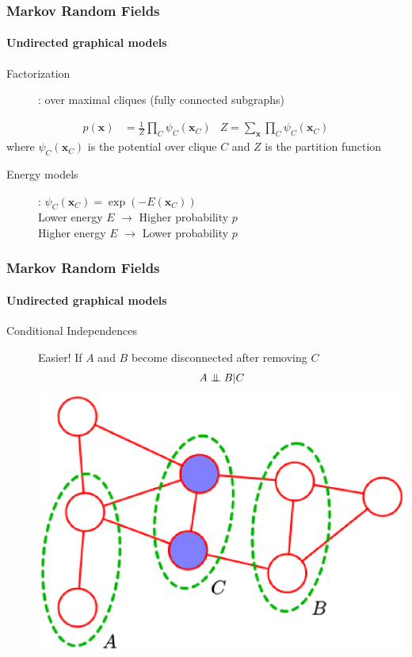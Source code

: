 \documentclass[slidestop,compress,mathserif]{beamer}
\newcommand{\indep}{\ensuremath{\perp\mkern -10mu \perp}}
\begin{document}
\begin{frame}
	\frametitle{Markov Random Fields}
	\framesubtitle{Undirected graphical models}
    \begin{description}
    \item[Factorization]: over maximal cliques (fully connected subgraphs)
    \end{description}
    \begin{align*}
    p(\mathbf{x})&=\frac{1}{Z}\prod_C \psi_C(\mathbf{x}_C)
    &
    Z = \sum_\mathbf{x}\prod_C \psi_C(\mathbf{x}_C)
    \end{align*}
    where $\psi_C(\mathbf{x}_C)$ is the potential over clique $C$ and
    $Z$ is the partition function
     \begin{description}
    \item[Energy models]: $\psi_C(\mathbf{x}_C) = \exp(-E(\mathbf{x}_C))$\\
    Lower energy $E$ $\rightarrow$ Higher probability $p$\\
    Higher energy $E$ $\rightarrow$ Lower probability $p$
  \end{description}
  
\end{frame} 


\begin{frame}
	\frametitle{Markov Random Fields}
	\framesubtitle{Undirected graphical models}
    \begin{description}
    \item[Conditional Independences] Easier! If $A$ and $B$ become disconnected after removing $C$
    $$A\indep B | C$$
    \vspace{-.5cm}
      \includegraphics[width=.5\textwidth]{indepmrf}
  \end{description}
  
\end{frame} 
\end{document}
